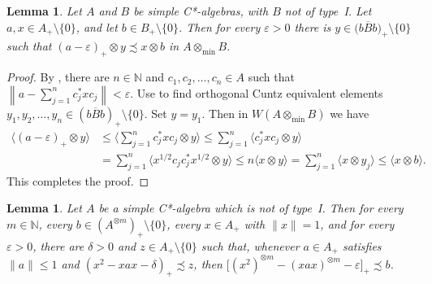 \documentclass[11pt]{amsart}
\theoremstyle{plain}
\newtheorem{lemma}[theorem]{Lemma}
\theoremstyle{definition}
\theoremstyle{remark}
\numberwithin{equation}{section}
\newcommand{\N}{\mathbb{N}}
\newcommand{\dt}{\delta}
\newcommand{\ep}{\varepsilon}
\begin{document}
\begin{lemma}\label{L_8808_Switch}
Let $A$ and $B$ be simple C*-algebras,
with $B$ not of type~I.
Let $a, x \in A_{+} \setminus \{ 0 \}$,
and let $b \in B_{+} \setminus \{ 0 \}$.
Then for every $\ep > 0$
there is
$y \in \bigl( {\overline{b B b}} \bigr)_{+} \setminus \{ 0 \}$
such that
$(a - \ep)_{+} \otimes y \precsim x \otimes b$
in $A \otimes_{\min} B$.
\end{lemma}

\begin{proof}
By \cite[Lemma 1.13]{Ph14},
there are $n \in \N$ and $c_1, c_2, \ldots, c_n \in A$
such that $\left\| a - \sum_{j = 1}^n c_j^* x c_j \right\| < \ep$.
Use \cite[Lemma~2.1]{Ph14} to find orthogonal
Cuntz equivalent elements
$y_1, y_2, \ldots, y_n \in ({\overline{b B b}} )_{+} \setminus \{ 0 \}$.
Set $y = y_1$.
Then in $W (A \otimes_{\min} B)$ we have
%
\begin{align*}
\bigl\langle (a - \ep)_{+} \otimes y \bigr\rangle
& \leq \Biggl\langle \sum_{j = 1}^n c_j^* x c_j \otimes y \Biggr\rangle
  \leq \sum_{j = 1}^n \bigl\langle c_j^* x c_j \otimes y \bigr\rangle
\\
& = \sum_{j = 1}^n \langle x^{1/2} c_j c_j^* x^{1/2} \otimes y \rangle
  \leq n \langle x \otimes y \rangle
  = \sum_{j = 1}^n \langle x \otimes y_j \rangle
  \leq \langle x \otimes b \rangle.
\end{align*}
%
This completes the proof.
\end{proof}


\begin{lemma}\label{L_8808_Dom}
Let $A$ be a simple C*-algebra which is not of type~I.
Then for every $m \in \N$,
every $b \in (A^{\otimes m})_{+} \setminus \{ 0 \}$,
every $x \in A_{+}$ with $\| x \| = 1$,
and for every $\ep > 0$,
there are $\dt > 0$ and $z \in A_{+} \setminus \{ 0 \}$
such that, whenever $a \in A_{+}$ satisfies $\| a \| \leq 1$
and $( x^2 - x a x - \dt )_{+} \precsim z$,
then
$\big[ (x^2)^{\otimes m} - (x a x)^{\otimes m} - \ep \bigr]_{+}
  \precsim b$.
\end{lemma}
\end{document}
